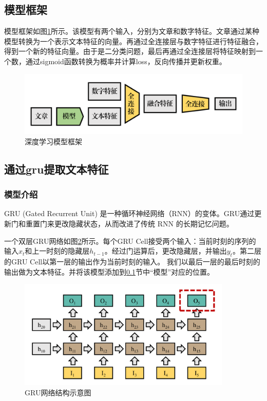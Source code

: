 \documentclass[lang=cn,a4paper]{elegantpaper}
\begin{document}
\subsection{模型框架}
\label{sec:frame}


模型框架如图\ref{fig:model frame}所示。该模型有两个输入，分别为文章和数字特征。文章通过某种模型转换为一个表示文本特征的向量。再通过全连接层与数字特征进行特征融合，得到一个新的特征向量。由于是二分类问题，最后再通过全连接层将特征映射到一个数，通过sigmoid函数转换为概率并计算loss，反向传播并更新权重。
\begin{figure}[!h]
  \centering
  \includegraphics[width=0.6\linewidth]{image/model frame.pdf}
  \caption{深度学习模型框架}
  \label{fig:model frame}
\end{figure}

\subsection{通过gru提取文本特征}
\subsubsection{模型介绍}
GRU (Gated Recurrent Unit) 是一种循环神经网络（RNN）的变体。GRU通过更新门和重置门来更改隐藏状态，从而改进了传统 RNN 的长期记忆问题。

一个双层GRU网络如图\ref{fig:gru}所示。每个GRU Cell接受两个输入：当前时刻的序列的输入$x_t$和上一时刻的隐藏层$h_{t-1}$。经过门运算后，更改隐藏层，并输出$y_t$。第二层的GRU Cell以第一层的输出作为当前时刻的输入。
我们以最后一层的最后时刻的输出做为文本特征。并将该模型添加到\ref{sec:frame}节中“模型”对应的位置。
\begin{figure}[!h]
  \centering
  \includegraphics[width=4in]{image/gru.pdf}
  \caption{GRU网络结构示意图}
  \label{fig:gru}
\end{figure}
\end{document}
